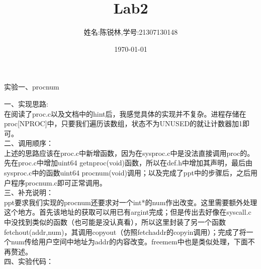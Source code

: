 \documentclass[12pt]{article}
\title{Lab2}
\author{姓名:陈锐林,学号:21307130148}
\date{\today}
\begin{document}
\maketitle
\begin{Large}
    \noindent 实验一、procnum\\
\end{Large}
\noindent 一、实现思路:\\
\hspace*{2em}在阅读了proc.c以及文档中的hint后，我感觉具体的实现并不复杂。进程存储在proc[NPROC]中，只要我们遍历该数组，状态不为UNUSED的就让计数器加1即可。\\
\noindent 二、调用顺序：\\
\hspace*{2em}上述的思路应该在proc.c中新增函数，因为在sysproc.c中是没法直接调用proc的。先在proc.c中增加uint64 getnproc(void)函数，所以在def.h中增加其声明，最后由sysproc.c中的函数uint64 procnum(void)调用；以及完成了ppt中的步骤后，之后用户程序procnum.c即可正常调用。\\
\noindent 三、补充说明：\\
\hspace*{2em}ppt要求我们实现的procnum还要求对一个int*的num作出改变。这里需要额外处理这个地方。首先该地址的获取可以用已有argint完成；但是传出去好像在syscall.c中没找到类似的函数（也可能是没认真看），所以这里封装了另一个函数fetchout(addr,num)，其调用copyout（仿照fetchaddr的copyin调用）；完成了将一个num传给用户空间中地址为addr的内容改变。freemem中也是类似处理，下面不再赘述。\\
\noindent 四、实验代码：
\begin{figure}[!h]
    \centering
    \hfill
\end{figure}\\
\end{document}
